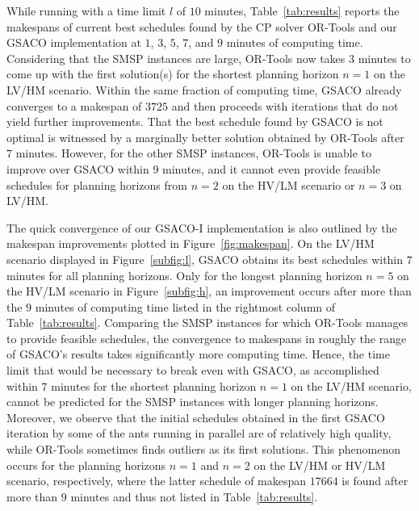 %
While running with a time limit $l$ of $10$ minutes,
Table~\ref{tab:results} reports the makespans of current best schedules
found by the CP solver OR-Tools and our GSACO implementation
at $1$, $3$, $5$, $7$, and $9$ minutes of computing time.
Considering that the SMSP instances are large,
OR-Tools now takes $3$ minutes to come up with the first solution(s)
for the shortest planning horizon $n=1$ on the LV/HM scenario.
Within the same fraction of computing time, GSACO already converges to a
makespan of $3725$ and then proceeds with iterations that do not
yield further improvements.
That the best schedule found by GSACO is not optimal is witnessed by a
marginally better solution obtained by OR-Tools after $7$ minutes.
However, for the other SMSP instances, OR-Tools is unable to improve over
GSACO within $9$ minutes, and it cannot even provide feasible schedules
for planning horizons from $n=2$ on the HV/LM scenario or $n=3$ 
on LV/HM.

The quick convergence of our GSACO-I implementation is also outlined by the makespan improvements plotted in Figure~\ref{fig:makespan}.
On the LV/HM scenario displayed in Figure~\ref{subfig:l}, 
GSACO obtains its best schedules within $7$ minutes
for all planning horizons.
Only for the longest planning horizon $n=5$
on the HV/LM scenario in Figure~\ref{subfig:h},
an improvement occurs after more than the $9$ minutes of computing time
listed in the rightmost column of Table~\ref{tab:results}.
Comparing the SMSP instances for which OR-Tools manages to provide
feasible schedules,
the convergence to makespans in roughly the range of GSACO's results
takes significantly more computing time.
Hence, the time limit that would be necessary to break even with GSACO,
as accomplished within $7$ minutes for the shortest planning horizon
$n=1$ on the LV/HM scenario,
cannot be predicted for the SMSP instances with longer planning horizons.
Moreover, we observe that the initial schedules obtained 
in the first GSACO iteration by some of the ants running in parallel are of relatively high quality, while
OR-Tools sometimes finds outliers as its first solutions.
This phenomenon occurs for the planning horizons $n=1$ and $n=2$
on the LV/HM or HV/LM scenario, respectively, where the latter
schedule of makespan $17664$ is found after more than $9$ minutes
and thus not listed in Table~\ref{tab:results}.

